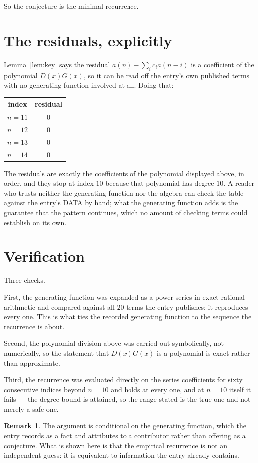 \documentclass[11pt,a4paper]{article}
\theoremstyle{plain}
\theoremstyle{definition}
\newtheorem{remark}[theorem]{Remark}
\begin{document}
So the conjecture is the minimal recurrence.

\section{The residuals, explicitly}

Lemma~\ref{lem:key} says the residual $a(n)-\sum_ic_ia(n-i)$ is a coefficient of the
polynomial $D(x)G(x)$, so it can be read off the entry's own published terms with no
generating function involved at all. Doing that:
\begin{center}
\begin{tabular}{cc}
index & residual \\ \hline
$n=11$ & $0$ \\
$n=12$ & $0$ \\
$n=13$ & $0$ \\
$n=14$ & $0$
\end{tabular}
\end{center}
The residuals are exactly the coefficients of the polynomial displayed above, in order, and
they stop at index $10$ because that polynomial has degree $10$. A reader who trusts
neither the generating function nor the algebra can check the table against the entry's DATA
by hand; what the generating function adds is the guarantee that the pattern continues, which
no amount of checking terms could establish on its own.

\section{Verification}

Three checks.

First, the generating function was expanded as a power series in exact rational arithmetic and
compared against all $20$ terms the entry publishes: it reproduces every one. This is
what ties the recorded generating function to the sequence the recurrence is about.

Second, the polynomial division above was carried out symbolically, not numerically, so the
statement that $D(x)G(x)$ is a polynomial is exact rather than approximate.

Third, the recurrence was evaluated directly on the series coefficients for sixty consecutive
indices beyond $n=10$ and holds at every one, and at $n=10$ itself it fails --- the
degree bound is attained, so the range stated is the true one and not merely a safe one.

\begin{remark}
The argument is conditional on the generating function, which the entry records as a fact and
attributes to a contributor rather than offering as a conjecture. What is shown here is that
the empirical recurrence is not an independent guess: it is equivalent to information the
entry already contains.
\end{remark}
\end{document}
